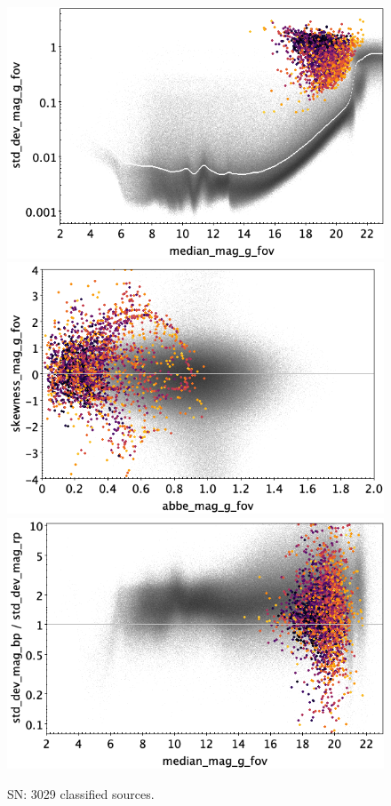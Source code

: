 \documentclass[longauth]{aa}
\begin{document}
\begin{appendix}
\begin{figure}
\hspace{2mm}
 \includegraphics[width=0.45\hsize]{figures/appendix/SN_cls_msd.png} \\ %
\vspace{4mm}
 \includegraphics[width=0.45\hsize]{figures/appendix/SN_cls_ask.png}  %
\hspace{2mm}
 \includegraphics[width=0.45\hsize]{figures/appendix/SN_cls_msdr.png}  \\ %
\vspace{4mm}
 \caption{SN: 3029 classified sources.}  
 \label{fig:app:SN}
\end{figure}


\end{appendix}
\end{document}
